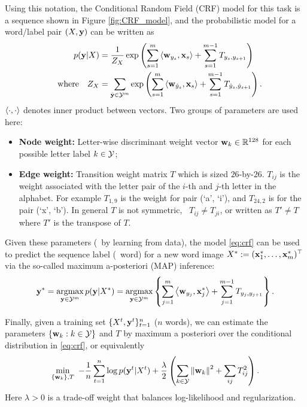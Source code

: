 \documentclass[11pt]{report}
\begin{document}
Using this notation, the Conditional Random Field (CRF) model for this task is a sequence shown in Figure \ref{fig:CRF_model},
and the probabilistic model for a word/label pair $(X, \mathbf{\boldsymbol{y}})$ can be written as
\begin{align}
\label{eq:crf}
  p(\mathbf{\boldsymbol{y}} | X ) &= \frac{1}{Z_X} \exp \left(\sum_{s=1}^m \left\langle \mathbf{\boldsymbol{w}}_{y_s},\mathbf{\boldsymbol{x}}_s \right\rangle + \sum_{s=1}^{m-1} T_{y_s, y_{s+1}}\right) \\
  {\quad \text{where} \quad} Z_X &= \sum_{\hat{\mathbf{\boldsymbol{y}}} \in \mathcal{Y}^m} \exp \left(\sum_{s=1}^m \left\langle \mathbf{\boldsymbol{w}}_{\hat{y}_s},\mathbf{\boldsymbol{x}}_s \right\rangle + \sum_{s=1}^{m-1} T_{\hat{y}_s, \hat{y}_{s+1}}\right).
\end{align}
%
$\left\langle \cdot,\cdot \right\rangle$ denotes inner product between vectors.
Two groups of parameters are used here:

\begin{itemize}
\item {\bf Node weight:} Letter-wise discriminant weight vector $\mathbf{\boldsymbol{w}}_k \in \mathbb{R}^{128}$ for each possible letter label $k \in \mathcal{Y}$;
\item {\bf Edge weight:} Transition weight matrix $T$ which is sized $26$-by-$26$.
$T_{ij}$ is the weight associated with the letter pair of the $i$-th and $j$-th letter in the alphabet.  For example $T_{1,9}$ is the weight for pair (`a', `i'), and $T_{24,2}$ is for the pair (`x', `b'). In general $T$ is not symmetric, \ie\ $T_{ij} \neq T_{ji}$, or written as $T' \neq T$ where $T'$ is the transpose of $T$.
\end{itemize}
Given these parameters (\eg\ by learning from data), the model \eqref{eq:crf} can be used to predict the sequence label (\ie\ word) for a new word image $X^* := (\mathbf{\boldsymbol{x}}^*_1, \ldots, \mathbf{\boldsymbol{x}}^*_m)^\top$ via the so-called maximum a-posteriori (MAP) inference:
\begin{align}
  \label{eq:crf_decode}
  \mathbf{\boldsymbol{y}}^* = \operatorname*{\mathrm{argmax}}_{\mathbf{\boldsymbol{y}} \in \mathcal{Y}^m} p(\mathbf{\boldsymbol{y}} | X^*)
  = \operatorname*{\mathrm{argmax}}_{\mathbf{\boldsymbol{y}} \in \mathcal{Y}^m} \left\{ \sum_{j=1}^m \left\langle \mathbf{\boldsymbol{w}}_{y_j},\mathbf{\boldsymbol{x}}^*_j \right\rangle + \sum_{j=1}^{m-1} T_{y_j, y_{j+1}}\right\}.
\end{align}

Finally, given a training set $\{X^t, \mathbf{\boldsymbol{y}}^t\}_{t=1}^n$ ($n$ words),
we can estimate the parameters $\{\mathbf{\boldsymbol{w}}_k : k \in \mathcal{Y}\}$ and $T$ by maximum a posteriori over the conditional distribution in \eqref{eq:crf}, or equivalently
\begin{align}
\label{eq:obj_MLE}
  \min_{\{\mathbf{\boldsymbol{w}}_k\}, T} \ -\frac{1}{n}\sum_{t=1}^n \log p(\mathbf{\boldsymbol{y}}^t | X^t) + \frac{\lambda}{2} \left(\sum_{k \in \mathcal{Y}} \left\|\mathbf{\boldsymbol{w}}_k\right\|^2 + \sum_{ij} T^2_{ij}\right).
\end{align}
Here $\lambda > 0$ is a trade-off weight that balances log-likelihood and regularization.
\begin{center}
\end{center}
\end{document}
